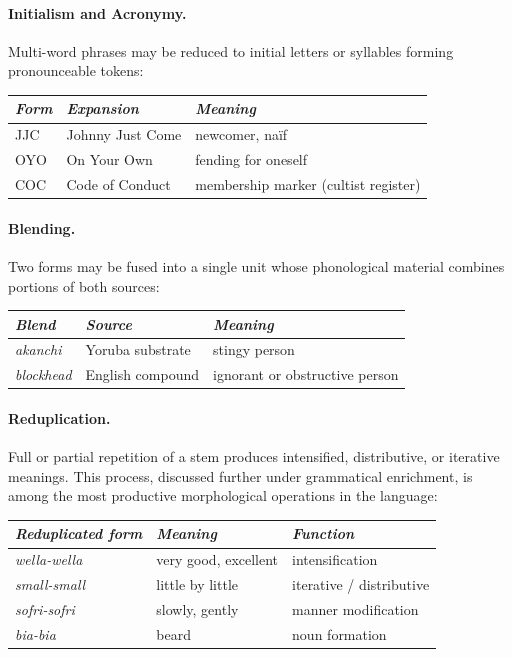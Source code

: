 \documentclass[12pt]{article}
\begin{document}
\paragraph{Initialism and Acronymy.}
Multi-word phrases may be reduced to initial letters or syllables forming pronounceable tokens:

\begin{center}
\begin{tabular}{lll}
\textit{Form} & \textit{Expansion} & \textit{Meaning} \\
\hline
JJC & Johnny Just Come & newcomer, na\"{i}f \\
OYO & On Your Own & fending for oneself \\
COC & Code of Conduct & membership marker (cultist register) \\
\end{tabular}
\end{center}

\paragraph{Blending.}
Two forms may be fused into a single unit whose phonological material combines portions of both sources:

\begin{center}
\begin{tabular}{lll}
\textit{Blend} & \textit{Source} & \textit{Meaning} \\
\hline
\textit{akanchi} & Yoruba substrate & stingy person \\
\textit{blockhead} & English compound & ignorant or obstructive person \\
\end{tabular}
\end{center}

\paragraph{Reduplication.}
Full or partial repetition of a stem produces intensified, distributive, or iterative meanings. This process, discussed further under grammatical enrichment, is among the most productive morphological operations in the language:

\begin{center}
\begin{tabular}{lll}
\textit{Reduplicated form} & \textit{Meaning} & \textit{Function} \\
\hline
\textit{wella-wella} & very good, excellent & intensification \\
\textit{small-small} & little by little & iterative / distributive \\
\textit{sofri-sofri} & slowly, gently & manner modification \\
\textit{bia-bia} & beard & noun formation \\
\end{tabular}
\end{center}
\end{document}
